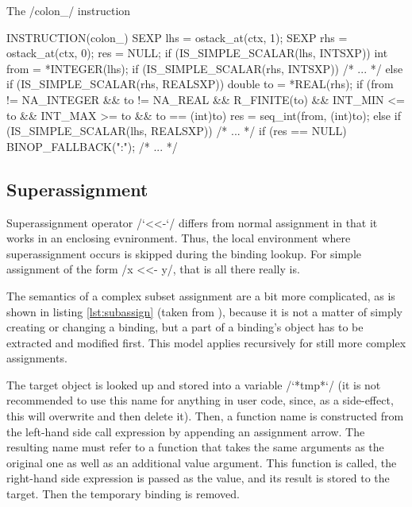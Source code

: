 \begin{listing}[htbp]
  \caption{\label{lst:colon}The \cinline/colon_/ instruction}
  \begin{ccode}
INSTRUCTION(colon_) {
    SEXP lhs = ostack_at(ctx, 1);
    SEXP rhs = ostack_at(ctx, 0);
    res = NULL;
    if (IS_SIMPLE_SCALAR(lhs, INTSXP)) {
        int from = *INTEGER(lhs);
        if (IS_SIMPLE_SCALAR(rhs, INTSXP)) {
            /* ... */
        } else if (IS_SIMPLE_SCALAR(rhs, REALSXP)) {
            double to = *REAL(rhs);
            if (from != NA_INTEGER && to != NA_REAL &&
                    R_FINITE(to) &&	INT_MIN <= to &&
                    INT_MAX >= to && to == (int)to) {
                res = seq_int(from, (int)to);
            }
        }
    } else if (IS_SIMPLE_SCALAR(lhs, REALSXP)) {
        /* ... */
    }
    if (res == NULL) {
        BINOP_FALLBACK(":");
    }
    /* ... */
}
  \end{ccode}
\end{listing}


\subsection{Superassignment}

Superassignment operator \rinline/`<<-`/ differs from normal assignment in that it works in an enclosing evnironment. Thus, the local environment where superassignment occurs is skipped during the binding lookup. For simple assignment of the form \rinline/x <<- y/, that is all there really is.

The semantics of a complex subset assignment are a bit more complicated, as is shown in listing \ref{lst:subassign} (taken from \autocite{subset}), because it is not a matter of simply creating or changing a binding, but a part of a binding's object has to be extracted and modified first. This model applies recursively for still more complex assignments.

The target object is looked up and stored into a variable \rinline/`*tmp*`/ (it is not recommended to use this name for anything in user code, since, as a side-effect, this will overwrite and then delete it). Then, a function name is constructed from the left-hand side call expression by appending an assignment arrow. The resulting name must refer to a function that takes the same arguments as the original one as well as an additional value argument. This function is called, the right-hand side expression is passed as the value, and its result is stored to the target. Then the temporary binding is removed.

